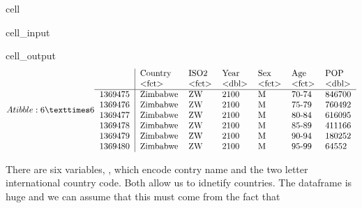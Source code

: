 \documentclass[letterpaper,10pt,english]{jupyterBook}
\begin{document}
\begin{sphinxuseclass}{cell}\begin{sphinxVerbatimInput}

\begin{sphinxuseclass}{cell_input}
\begin{sphinxVerbatim}[commandchars=\\\{\}]
\end{sphinxVerbatim}

\end{sphinxuseclass}\end{sphinxVerbatimInput}
\begin{sphinxVerbatimOutput}

\begin{sphinxuseclass}{cell_output}\begin{equation*}
\begin{split}A tibble: 6 × 6
\begin{tabular}{r|llllll}
  & Country & ISO2 & Year & Sex & Age & POP\\
  & <fct> & <fct> & <dbl> & <fct> & <fct> & <dbl>\\
\hline
	1369475 & Zimbabwe & ZW & 2100 & M & 70-74 & 846700\\
	1369476 & Zimbabwe & ZW & 2100 & M & 75-79 & 760492\\
	1369477 & Zimbabwe & ZW & 2100 & M & 80-84 & 616095\\
	1369478 & Zimbabwe & ZW & 2100 & M & 85-89 & 411166\\
	1369479 & Zimbabwe & ZW & 2100 & M & 90-94 & 180252\\
	1369480 & Zimbabwe & ZW & 2100 & M & 95-99 &  64552\\
\end{tabular}\end{split}
\end{equation*}
\end{sphinxuseclass}\end{sphinxVerbatimOutput}

\end{sphinxuseclass}
\sphinxAtStartPar
There are six variables, ,  which encode contry name and the two letter international country code. Both allow us to idnetify countries. The dataframe is huge and we can assume that this must come from the fact that
\end{document}
